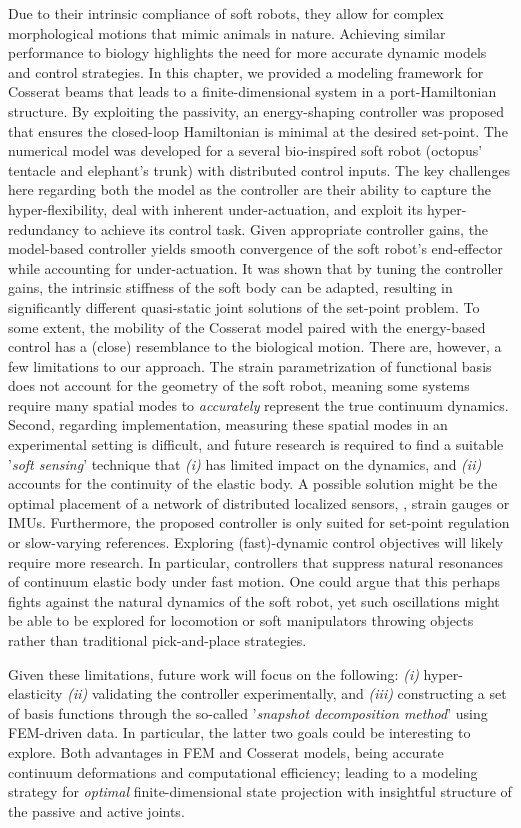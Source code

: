 Due to their intrinsic compliance of soft robots, they allow for complex morphological motions that mimic animals in nature. Achieving similar performance to biology highlights the need for more accurate dynamic models and control strategies. In this chapter, we provided a modeling framework for Cosserat beams that leads to a finite-dimensional system in a port-Hamiltonian structure. By exploiting the passivity, an energy-shaping controller was proposed that ensures the closed-loop Hamiltonian is minimal at the desired set-point. The numerical model was developed for a several bio-inspired soft robot (octopus' tentacle and elephant's trunk) with distributed control inputs. The key challenges here regarding both the model as the controller are their ability to capture the hyper-flexibility, deal with inherent under-actuation, and exploit its hyper-redundancy to achieve its control task. Given appropriate controller gains, the model-based controller yields smooth convergence of the soft robot's end-effector while accounting for under-actuation. It was shown that by tuning the controller gains, the intrinsic stiffness of the soft body can be adapted, resulting in significantly different quasi-static joint solutions of the set-point problem. To some extent, the mobility of the Cosserat model paired with the energy-based control has a (close) resemblance to the biological motion.  There are, however, a few limitations to our approach. The strain parametrization of functional basis does not account for the geometry of the soft robot, meaning some systems require many spatial modes to \textit{accurately} represent the true continuum dynamics. Second, regarding implementation, measuring these spatial modes in an experimental setting is difficult, and future research is required to find a suitable '\textit{soft sensing}' technique that  \textit{(i)} has limited impact on the dynamics, and \textit{(ii)} accounts for the continuity of the elastic body. A possible solution might be the optimal placement of a network of distributed localized sensors, \eg, strain gauges or IMUs. Furthermore, the proposed controller is only suited for set-point regulation or slow-varying references. Exploring (fast)-dynamic control objectives will likely require more research. In particular, controllers that suppress natural resonances of continuum elastic body under fast motion. One could argue that this perhaps fights against the natural dynamics of the soft robot, yet such oscillations might be able to be explored for locomotion or soft manipulators throwing objects rather than traditional pick-and-place strategies.

Given these limitations, future work will focus on the following: \textit{(i) }hyper-elasticity \textit{(ii)} validating the controller experimentally, and \textit{(iii)} constructing a set of basis functions through the so-called '\emph{snapshot decomposition method}' using FEM-driven data. In particular, the latter two goals could be interesting to explore. Both advantages in FEM and Cosserat models, being accurate continuum deformations and computational efficiency; leading to a modeling strategy for \textit{optimal} finite-dimensional state projection with insightful structure of the passive and active joints.
